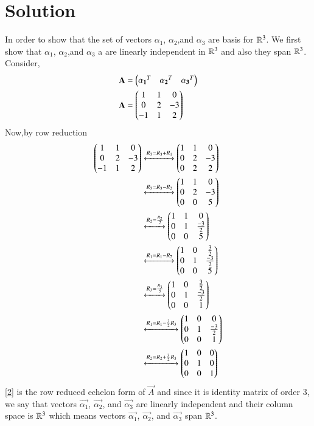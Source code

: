 \documentclass[journal,12pt,twocolumn]{IEEEtran}
\begin{document}
\section{Solution}
In order to show that the set of vectors $\alpha_1$, $\alpha_2$,and $\alpha_3$  are basis for $\mathbb{R}^3$. We first show that $\alpha_1$, $\alpha_2$,and $\alpha_3$ a  are linearly independent in $\mathbb{R}^3$ and also they span $\mathbb{R}^3$. Consider,
\begin{align}
& \mathbf{A} = \begin{pmatrix}\mathbf{\alpha_1}^T & \mathbf{\alpha_2}^T & \mathbf{\alpha_3}^T \end{pmatrix} \\
& \mathbf{A} = \begin{pmatrix}1 & 1 &  0 \\ 0 & 2 & -3  \\ -1 & 1 & 2 \end{pmatrix}\label{eqA}
\end{align}
Now,by row reduction
\begin{align}
\begin{pmatrix}1 & 1 &  0 \\ 0 & 2 & -3  \\ -1 & 1 & 2\end{pmatrix} &\xleftrightarrow[]{R_3=R_3+R_1}\begin{pmatrix}1 & 1 &  0 \\ 0 & 2 & -3  \\ 0 & 2 & 2  \end{pmatrix} \\
 &\xleftrightarrow[]{R_3=R_3-R_2}\begin{pmatrix}1 & 1 &  0 \\ 0 & 2 & -3  \\ 0 & 0 & 5  \end{pmatrix} \\
&\xleftrightarrow[]{R_2=\frac{R_2}{2}}\begin{pmatrix}1 & 1 &  0 \\ 0 & 1 &\frac{-3}{2}   \\ 0 & 0 & 5  \end{pmatrix} \\
&\xleftrightarrow[]{R_1=R_1-R_2}\begin{pmatrix}1 & 0 &  \frac{3}{2} \\ 0 & 1 &\frac{-3}{2}   \\ 0 & 0 & 5  \end{pmatrix} \\
&\xleftrightarrow[]{R_3=\frac{R_3}{5}}\begin{pmatrix}1 & 0 &   \frac{3}{2} \\ 0 & 1 & \frac{-3}{2}   \\ 0 & 0 & 1  \end{pmatrix} \\
&\xleftrightarrow[]{R_1=R_1-\frac{3}{2}R_3}\begin{pmatrix}1 & 0 &  0 \\ 0 & 1 & \frac{-3}{2}   \\ 0 & 0 & 1  \end{pmatrix} \\
&\xleftrightarrow[]{R_2=R_2+\frac{3}{2}R_3}\begin{pmatrix}1 & 0 &  0 \\ 0 & 1 & 0  \\ 0 & 0 & 1  \end{pmatrix} \label{2}
\end{align}
\eqref{2} is the row reduced echelon form of $\vec{A}$ and since it is identity matrix of order 3, we say that vectors $\vec{\alpha_1}$, $\vec{\alpha_2}$, and $\vec{\alpha_3}$  are linearly independent and their column space is $\mathbb{R}^3$ which means vectors $\vec{\alpha_1}$, $\vec{\alpha_2}$, and $\vec{\alpha_3}$  span $\mathbb{R}^3$.
\end{document}
